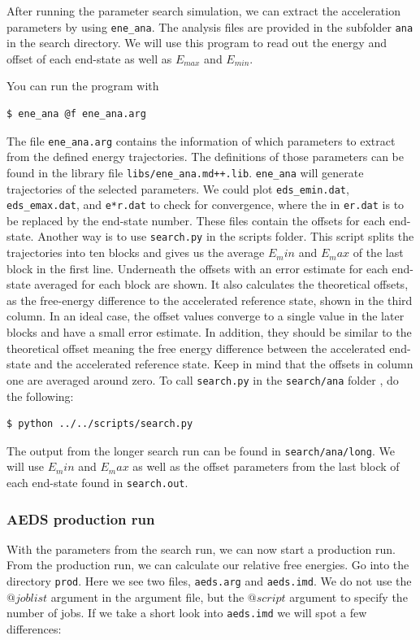 After running the parameter search simulation, we can extract the acceleration parameters by using \texttt{ene\_ana}. The analysis files are provided in the subfolder \texttt{ana} in the search directory. 
We will use this program to read out the energy and offset of each end-state as well as $E_{max}$ and $E_{min}$. 

You can run the program with 
\begin{lstlisting}
$ ene_ana @f ene_ana.arg
\end{lstlisting}

The file \texttt{ene\_ana.arg} contains the information of which parameters to extract from the defined energy trajectories. The definitions of those parameters can be found in the library file \texttt{libs/ene\_ana.md++.lib}. \texttt{ene\_ana} will generate trajectories of the selected parameters. We could plot \texttt{eds\_emin.dat}, \texttt{eds\_emax.dat}, and \texttt{e*r.dat} to check for convergence, where the \* in \texttt{e\*r.dat} is to be replaced by the end-state number. These files contain the offsets for each end-state. Another way is to use \texttt{search.py} in the scripts folder. This script splits the trajectories into ten blocks and gives us the average $E_min$ and $E_max$ of the last block in the first line. Underneath the offsets with an error estimate for each end-state averaged for each block are shown. It also calculates the theoretical offsets, as the free-energy difference to the accelerated reference state, shown in the third column. In an ideal case, the offset values converge to a single value in the later blocks and have a small error estimate. In addition, they should be similar to the theoretical offset meaning the free energy difference between the accelerated end-state and the accelerated reference state. Keep in mind that the offsets in column one are averaged around zero.
To call \texttt{search.py} in the \texttt{search/ana} folder , do the following:

\begin{lstlisting}
$ python ../../scripts/search.py
\end{lstlisting}

The output from the longer search run can be found in \texttt{search/ana/long}.
We will use $E_min$ and $E_max$ as well as the offset parameters from the last block of each end-state found in \texttt{search.out}.

\subsubsection{AEDS production run}
With the parameters from the search run, we can now start a production run. From the production run, we can calculate our relative free energies. Go into the directory \texttt{prod}. Here we see two files, \texttt{aeds.arg} and \texttt{aeds.imd}. We do not use the $@joblist$ argument in the argument file, but the $@script$ argument to specify the number of jobs. If we take a short look into \texttt{aeds.imd} we will spot a few differences:

